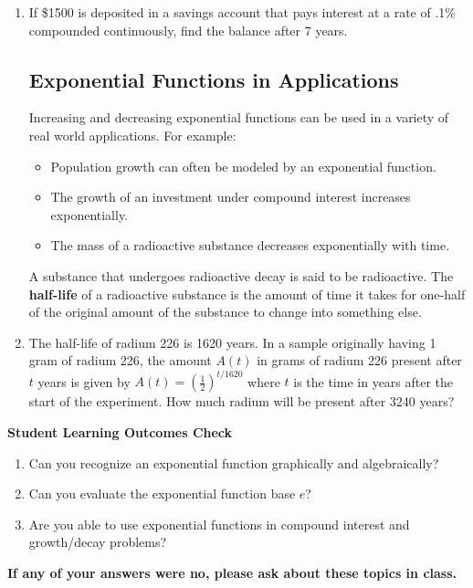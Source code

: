 \begin{enumerate}
  \vfill

\clearpage

\noindent
{}


\item If \$1500 is deposited in a savings account that pays interest
  at a rate of .1\% compounded continuously, find the balance after 7
  years.

  \vfill


\clearpage

\subsection{Exponential Functions in Applications} 
Increasing and decreasing exponential functions can be used in a
variety of real world applications.  For example:
\begin{itemize}
\item Population growth can often be modeled by an exponential function.
\item The growth of an investment under compound interest increases exponentially.
\item The mass of a radioactive substance decreases exponentially with time.
\end{itemize}

\noindent A substance that undergoes radioactive decay is said to be radioactive.  The \textbf{half-life} of a radioactive substance is the amount of time it takes for one-half of the original amount of the substance to change into something else.

\item The half-life of radium 226 is 1620 years.  In a sample originally having 1 gram of radium 226, the amount $A(t)$ in grams of radium 226 present after $t$ years is given by $\displaystyle A(t)=(\frac{1}{2})^{t/1620}$ where $t$ is the time in years after the start of the experiment.  How much radium will be present after 3240 years? 
\vfill


\end{enumerate}

\noindent \textbf{Student Learning Outcomes Check}

\begin{enumerate}
\item Can you recognize an exponential function graphically and algebraically?
\item Can you evaluate the exponential function base $e$?
\item Are you able to use exponential functions in compound interest and growth/decay problems?

\end{enumerate}

\noindent \textbf{If any of your answers were no, please ask about these topics in class.}

